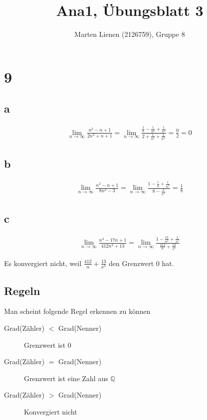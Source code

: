 \documentclass[a4paper,10pt]{article}
\title{Ana1, Übungsblatt 3}
\author{Marten Lienen (2126759), Gruppe 8}
\begin{document}
\maketitle

\section*{9}

\subsection*{a}

\begin{align*}
 \lim_{n \rightarrow \infty} \frac{n^2 - n + 1}{2n^3 + n + 1} = \lim_{n \rightarrow \infty} \frac{\frac{1}{n} - \frac{1}{n^2} + \frac{1}{n^3}}{2 + \frac{1}{n^2} + \frac{1}{n^3}} = \frac{0}{2} = 0
\end{align*}

\subsection*{b}

\begin{align*}
 \lim_{n \rightarrow \infty} \frac{n^2 - n + 1}{8n^2 - 3} = \lim_{n \rightarrow \infty} \frac{1 - \frac{1}{n} + \frac{1}{n^2}}{8 - \frac{3}{n^2}} = \frac{1}{8}
\end{align*}

\subsection*{c}

\begin{align*}
 \lim_{n \rightarrow \infty} \frac{n^3 - 17n + 1}{412n^2 + 13} = \lim_{n \rightarrow \infty} \frac{1 - \frac{17}{n^2} + \frac{1}{n^3}}{\frac{412}{n} + \frac{13}{x^3}}
\end{align*}

Es konvergiert nicht, weil $\frac{412}{n} + \frac{13}{x^3}$ den Grenzwert $0$ hat.

\subsection*{Regeln}

Man scheint folgende Regel erkennen zu können

\begin{description}
 \item[Grad(Zähler) $<$ Grad(Nenner)] Grenzwert ist $0$
 \item[Grad(Zähler) $=$ Grad(Nenner)] Grenzwert ist eine Zahl aus $\mathbb{Q}$
 \item[Grad(Zähler) $>$ Grad(Nenner)] Konvergiert nicht
\end{description}
\end{document}
